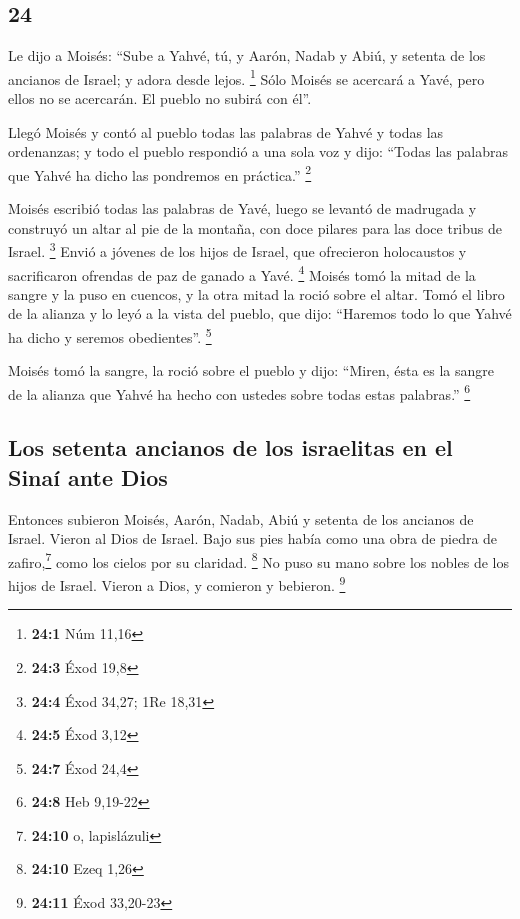 \begin{paracol}{2}
\hypertarget{section-46}{%
\section{24}\label{section-46}}

 Le dijo a Moisés: ``Sube a Yahvé, tú, y Aarón, Nadab y
Abiú, y setenta de los ancianos de Israel; y adora desde lejos.
\footnote{\textbf{24:1} Núm 11,16}  Sólo Moisés se
acercará a Yavé, pero ellos no se acercarán. El pueblo no subirá con
él''.

 Llegó Moisés y contó al pueblo todas las palabras de
Yahvé y todas las ordenanzas; y todo el pueblo respondió a una sola voz
y dijo: ``Todas las palabras que Yahvé ha dicho las pondremos en
práctica.'' \footnote{\textbf{24:3} Éxod 19,8}

 Moisés escribió todas las palabras de Yavé, luego se
levantó de madrugada y construyó un altar al pie de la montaña, con doce
pilares para las doce tribus de Israel. \footnote{\textbf{24:4} Éxod
  34,27; 1Re 18,31}  Envió a jóvenes de los hijos de
Israel, que ofrecieron holocaustos y sacrificaron ofrendas de paz de
ganado a Yavé. \footnote{\textbf{24:5} Éxod 3,12}  Moisés
tomó la mitad de la sangre y la puso en cuencos, y la otra mitad la
roció sobre el altar.  Tomó el libro de la alianza y lo
leyó a la vista del pueblo, que dijo: ``Haremos todo lo que Yahvé ha
dicho y seremos obedientes''. \footnote{\textbf{24:7} Éxod 24,4}

 Moisés tomó la sangre, la roció sobre el pueblo y dijo:
``Miren, ésta es la sangre de la alianza que Yahvé ha hecho con ustedes
sobre todas estas palabras.'' \footnote{\textbf{24:8} Heb 9,19-22}

\hypertarget{los-setenta-ancianos-de-los-israelitas-en-el-sinauxed-ante-dios}{%
\subsection{Los setenta ancianos de los israelitas en el Sinaí ante
Dios}\label{los-setenta-ancianos-de-los-israelitas-en-el-sinauxed-ante-dios}}

 Entonces subieron Moisés, Aarón, Nadab, Abiú y setenta de
los ancianos de Israel.  Vieron al Dios de Israel. Bajo
sus pies había como una obra de piedra de zafiro,\footnote{\textbf{24:10}
  o, lapislázuli} como los cielos por su claridad. \footnote{\textbf{24:10}
  Ezeq 1,26}  No puso su mano sobre los nobles de los
hijos de Israel. Vieron a Dios, y comieron y bebieron. \footnote{\textbf{24:11}
  Éxod 33,20-23}


\end{paracol}
